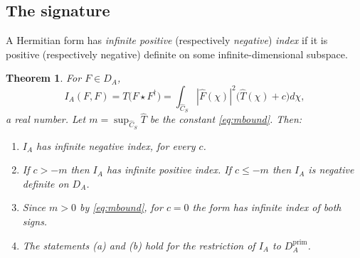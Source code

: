\documentclass[11pt]{amsart}
\newtheorem{theorem}{Theorem}[section]
\theoremstyle{definition}
\theoremstyle{remark}
\newcommand{\Th}{\widehat{T}}
\newcommand{\Ch}{\widehat{C}_S}
\newcommand{\DA}{D_A}
\begin{document}
\subsection{The signature}\label{sec:signature}

A Hermitian form has \emph{infinite positive} (respectively \emph{negative})
\emph{index} if it is positive (respectively negative) definite on some
infinite-dimensional subspace.

\begin{theorem}\label{thm:signature}
For $F\in\DA$,
\begin{equation}\label{eq:IAF}
I_A(F,F)=T\bigl(F\star F^{\dagger}\bigr)
=\int_{\Ch}|\widehat F(\chi)|^{2}\bigl(\Th(\chi)+c\bigr)d\chi ,
\end{equation}
a real number.  Let $m=\sup_{\Ch}\Th$ be the constant \eqref{eq:mbound}.
Then:
\begin{enumerate}
\item[(a)] $I_A$ has infinite negative index, for every $c$.
\item[(b)] If $c>-m$ then $I_A$ has infinite positive index.  If $c\le-m$
then $I_A$ is negative definite on $\DA$.
\item[(c)] Since $m>0$ by \eqref{eq:mbound}, for $c=0$ the form has infinite
index of both signs.
\item[(d)] The statements (a) and (b) hold for the restriction of $I_A$ to
$\DA^{\mathrm{prim}}$.
\end{enumerate}
\end{theorem}
\end{document}
